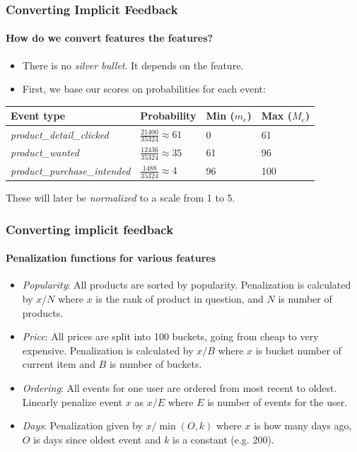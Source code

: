 \documentclass{beamer}
\begin{document}
  \begin{frame}
    \frametitle{Converting Implicit Feedback}
    \framesubtitle{How do we convert features the features?}
    \begin{itemize}
      \item There is no \textit{silver bullet}. It depends on the feature.
      \item First, we base our scores on probabilities for each event:
    \end{itemize}
    \begin{table}[H]
      \centering
      \begin{tabular}{llll}
        \toprule
          Event type & Probability & Min ($m_e$) & Max ($M_e$) \\
        \midrule
          \textit{product\_detail\_clicked}     & $\frac{21400}{35324} \approx 61$  & 0   & 61  \\[1.5ex]
          \textit{product\_wanted}              & $\frac{12436}{35324} \approx 35$  & 61  & 96  \\[1.5ex]
          \textit{product\_purchase\_intended}  & $\frac{1488}{35324} \approx 4$    & 96  & 100 \\
        \bottomrule
      \end{tabular}
    \end{table}
    These will later be \textit{normalized} to a scale from 1 to 5.
  \end{frame}

  \begin{frame}
    \frametitle{Converting implicit feedback}
    \framesubtitle{Penalization functions for various features}
    \begin{itemize}
      \item \textit{Popularity}: All products are sorted by popularity.
      Penalization is calculated by $x/N$ where $x$ is the rank of product in
      question, and $N$ is number of products.
      \item \textit{Price}: All prices are split into 100 buckets, going from
      cheap to very expensive. Penalization is calculated by $x/B$ where $x$ is
      bucket number of current item and $B$ is number of buckets.
      \item \textit{Ordering}: All events for one user are ordered from most
      recent to oldest. Linearly penalize event $x$ as $x/E$ where $E$ is
      number of events for the user.
      \item \textit{Days}: Penalization given by $x/\min({O,k})$ where $x$ is how many
      days ago, $O$ is days since oldest event and $k$ is a constant (e.g. 200).
    \end{itemize}
  \end{frame}
\end{document}
